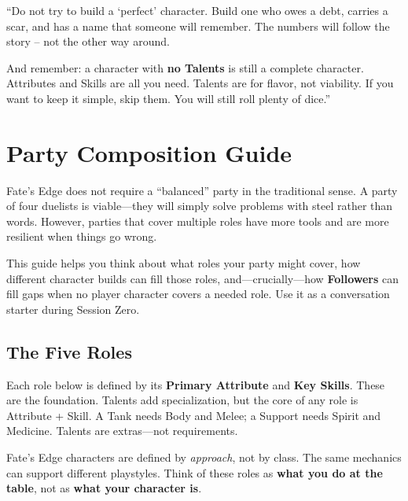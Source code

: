 \begin{tcolorbox}[colback=green!5!white,colframe=green!70!black,title=The Gray Wanderer's Advice,breakable]
``Do not try to build a `perfect' character. Build one who owes a debt, carries a scar, and has a name that someone will remember. The numbers will follow the story -- not the other way around.

And remember: a character with \textbf{no Talents} is still a complete character. Attributes and Skills are all you need. Talents are for flavor, not viability. If you want to keep it simple, skip them. You will still roll plenty of dice.''
\end{tcolorbox}

\newpage
\section{Party Composition Guide}

\begin{tcolorbox}[colback=blue!5!white,colframe=blue!75!black,title=Building a Balanced Party,breakable]
Fate's Edge does not require a ``balanced'' party in the traditional sense. A party of four duelists is viable---they will simply solve problems with steel rather than words. However, parties that cover multiple roles have more tools and are more resilient when things go wrong.

This guide helps you think about what roles your party might cover, how different character builds can fill those roles, and---crucially---how \textbf{Followers} can fill gaps when no player character covers a needed role. Use it as a conversation starter during Session Zero.
\end{tcolorbox}

\subsection{The Five Roles}

\begin{tcolorbox}[colback=blue!5!white,colframe=blue!75!black,title=Attributes and Skills Are Enough,breakable]
Each role below is defined by its \textbf{Primary Attribute} and \textbf{Key Skills}. These are the foundation. Talents add specialization, but the core of any role is Attribute + Skill. A Tank needs Body and Melee; a Support needs Spirit and Medicine. Talents are extras---not requirements.
\end{tcolorbox}

Fate's Edge characters are defined by \textit{approach}, not by class. The same mechanics can support different playstyles. Think of these roles as \textbf{what you do at the table}, not as \textbf{what your character is}.

